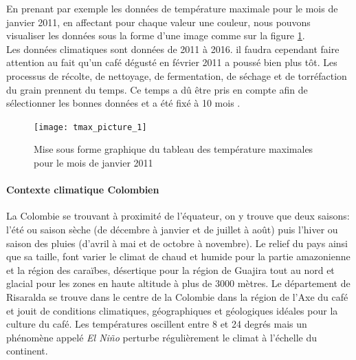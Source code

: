 \noindent En prenant par exemple les données de température maximale pour le mois de janvier 2011, en affectant pour chaque valeur une couleur, nous pouvons visualiser les données sous la forme d'une image comme sur la figure \ref{tmax_picture}.\\

\noindent Les données climatiques sont données de 2011 à 2016. il faudra cependant faire attention au fait qu'un café dégusté en février 2011 a poussé bien plus tôt. Les processus de récolte, de nettoyage, de fermentation, de séchage et de torréfaction du grain prennent du temps. Ce temps a dû être pris en compte afin de sélectionner les bonnes données et a été fixé à 10 mois . 


\begin{figure}[H]
	\centering
	\texttt{[image: tmax\_picture\_1]}
	\caption{\label{tmax_picture} Mise sous forme graphique du tableau des température maximales pour le mois de janvier 2011 }
\end{figure}

\paragraph{Contexte climatique Colombien}La Colombie se trouvant à proximité de l'équateur, on y trouve que deux saisons: l'été ou saison sèche (de décembre à janvier et de juillet à août) puis l'hiver ou saison des pluies (d'avril à mai et de octobre à novembre). Le relief du pays ainsi que sa taille, font varier le climat de chaud et humide pour la partie amazonienne et la région des caraïbes, désertique pour la région de Guajira tout au nord et glacial pour les zones en haute altitude à plus de 3000 mètres. Le département de Risaralda se trouve dans le centre de la Colombie dans la région de l'Axe du café et jouit de conditions climatiques, géographiques et géologiques idéales pour la culture du café. Les températures oscillent entre 8 et 24 degrés mais un phénomène appelé \textit{El Niño} perturbe régulièrement le climat à l'échelle du continent. 




